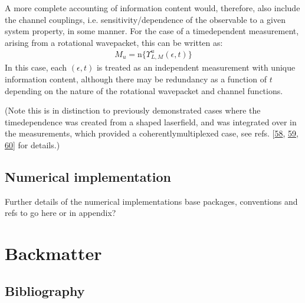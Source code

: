 \documentclass[letterpaper,table,10pt,english]{jupyterBook}
\begin{document}
\sphinxAtStartPar
A more complete accounting of information content would, therefore, also
include the channel couplings, i.e. sensitivity/dependence of the
observable to a given system property, in some manner. For the case of a
time\sphinxhyphen{}dependent measurement, arising from a rotational wavepacket, this
can be written as:
\begin{equation*}
\begin{split}M_{u}=\mathrm{n}\{\varUpsilon_{L,M}^{u}(\epsilon,t)\}\end{split}
\end{equation*}
\sphinxAtStartPar
In this case, each \((\epsilon,t)\) is treated as an independent
measurement with unique information content, although there may be
redundancy as a function of \(t\) depending on the nature of the
rotational wavepacket and channel functions.

\sphinxAtStartPar
(Note this is in
distinction to previously demonstrated cases where the time\sphinxhyphen{}dependence
was created from a shaped laser\sphinxhyphen{}field, and was integrated over in the
measurements, which provided a coherently\sphinxhyphen{}multiplexed case, see refs.
{[}\hyperlink{cite.backmatter/bibliography:id556}{58}, \hyperlink{cite.backmatter/bibliography:id558}{59}, \hyperlink{cite.backmatter/bibliography:id557}{60}{]} for details.)

\sphinxstepscope


\chapter{Numerical implementation}
\label{\detokenize{part1/numerics_231122:numerical-implementation}}\label{\detokenize{part1/numerics_231122:sec-numerical-details}}\label{\detokenize{part1/numerics_231122::doc}}
\sphinxAtStartPar
Further details of the numerical implementations \sphinxhyphen{} base packages, conventions and refs \sphinxhyphen{} to go here or in appendix?

\sphinxstepscope


\part{Backmatter}

\sphinxstepscope


\chapter{Bibliography}
\label{\detokenize{backmatter/bibliography:bibliography}}\label{\detokenize{backmatter/bibliography::doc}}\label{\detokenize{backmatter/bibliography:id1}}
\sphinxstepscope
\end{document}
